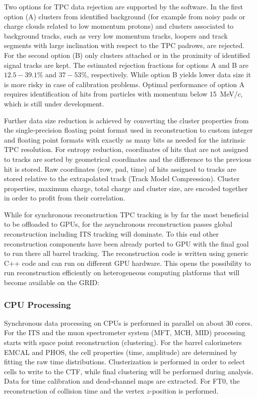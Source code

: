 Two options for TPC data rejection are supported by the software. In the first
option (A) clusters from identified background (for example from noisy pads or charge clouds
related to low momentum protons) and clusters associated to background tracks, such as very low momentum tracks, loopers and
track segments with large inclination with respect to the TPC padrows, are rejected.  For the second option (B) only clusters attached or
in the proximity of identified signal tracks are kept.
The estimated rejection fractions for options A and B are $12.5-39.1\%$ and $37-53\%$, respectively.
While option B yields lower data size it is more risky in case of calibration problems. Optimal
performance of option A requires identification of hits from particles with momentum below
15~MeV/$c$, which is still under development.

Further data size reduction is achieved by converting the cluster properties from the  single-precision floating point format used in reconstruction to custom integer and floating point formats with exactly as many bits as  needed  for the intrinsic TPC resolution. For entropy reduction, coordinates of hits that are not assigned to tracks
are sorted by geometrical coordinates and the difference to the previous
hit is stored. Raw coordinates (row, pad, time) of hits assigned to tracks
are stored relative to the extrapolated track (Track Model Compression).
Cluster properties, maximum charge, total charge and cluster size, are encoded together in order to profit from their correlation.

While for synchronous reconstruction TPC tracking is by far the most beneficial to be offloaded to GPUs, for the
asynchronous reconstruction passes global reconstruction including ITS tracking will dominate. To this
end other reconstruction components have been already ported to GPU with the final goal to run there
all barrel tracking. The reconstruction code is written using generic C++ code and can run on different
GPU hardware. This opens the possibility to run reconstruction efficiently on heterogeneous
computing platforms that will become available on the GRID:

\subsubsection{CPU Processing}
Synchronous data processing on CPUs is performed in parallel on about 30 cores.
For the ITS and the muon spectrometer system (MFT, MCH, MID) processing starts with space point reconstruction
(clustering). For the barrel calorimeters EMCAL and PHOS, the cell
properties (time, amplitude) are determined by
fitting the raw time distributions. Clusterization is performed in
order to select cells to write to the CTF, while final clustering
will be performed during analysis. Data for time calibration and
dead-channel maps are extracted. For FT0, the reconstruction of
collision time and the vertex $z$-position is performed.

